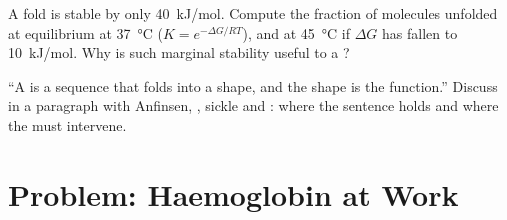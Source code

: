 \begin{exercise}[$\star\star\star$]\label{exo:b1:proteins:11}
A fold is stable by only \qty{40}{kJ/mol}. Compute the fraction of
molecules unfolded at equilibrium at \qty{37}{\celsius} ($K = e^{-\Delta G/RT}$),
and at \qty{45}{\celsius} if $\Delta G$ has fallen to
\qty{10}{kJ/mol}. Why is such marginal stability useful to a ?
\end{exercise}

\begin{exercise}[$\star\star\star$]\label{exo:b1:proteins:12}
``A  is a sequence that folds into a shape, and the shape is the
function.'' Discuss in a paragraph with Anfinsen, , sickle
 and : where the sentence holds and where the  must
intervene.
\end{exercise}

\section{Problem: Haemoglobin at Work}

